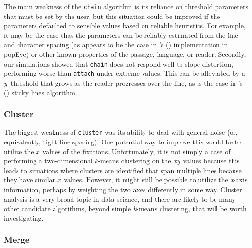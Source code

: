 \documentclass[doc,biblatex]{apa7}
\newcommand\possessivecite[1]{\citeauthor{#1}'s (\citeyear{#1})} %
\begin{document}
The main weakness of the \texttt{chain} algorithm is its reliance on threshold parameters that must be set by the user, but this situation could be improved if the parameters defaulted to sensible values based on reliable heuristics. For example, it may be the case that the parameters can be reliably estimated from the line and character spacing (as appears to be the case in \possessivecite{Schroeder:0000} implementation in popEye) or other known properties of the passage, language, or reader. Secondly, our simulations showed that \texttt{chain} does not respond well to slope distortion, performing worse than \texttt{attach} under extreme values. This can be alleviated by a \textit{y}~threshold that grows as the reader progresses over the line, as is the case in \possessivecite{Hyrskykari:2006} sticky lines algorithm.

\subsubsection{Cluster}

The biggest weakness of \texttt{cluster} was its ability to deal with general noise (or, equivalently, tight line spacing). One potential way to improve this would be to utilize the \textit{x}~values of the fixations. Unfortunately, it is not simply a case of performing a two-dimensional \textit{k}-means clustering on the \textit{xy}~values because this leads to situations where clusters are identified that span multiple lines because they have similar \textit{x}~values. However, it might still be possible to utilize the \textit{x}-axis information, perhaps by weighting the two axes differently in some way. Cluster analysis is a very broad topic in data science, and there are likely to be many other candidate algorithms, beyond simple \textit{k}-means clustering, that will be worth investigating.

\subsubsection{Merge}
\end{document}
